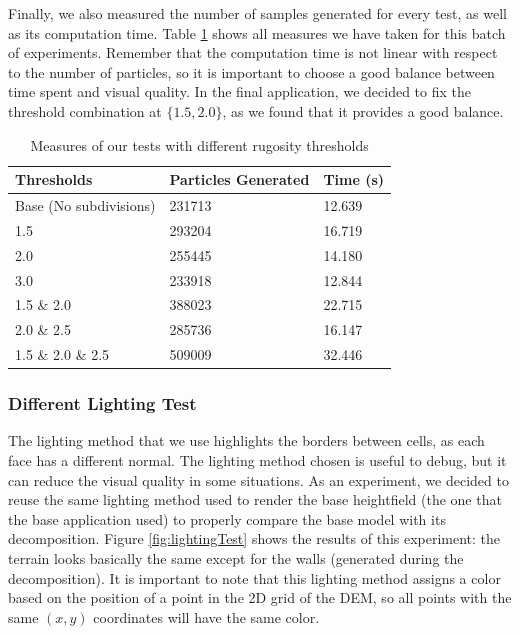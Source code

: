 \vspace{10pt}

Finally, we also measured the number of samples generated for every 
test, as well as its computation time. Table \ref{tab:rugosity} shows 
all measures we have taken for this batch of experiments. Remember 
that the computation time is not linear with respect to the number 
of particles, so it is important to choose a good balance between 
time spent and visual quality. In the final application, 
we decided to fix the threshold combination at $\{1.5, 2.0\}$, as 
we found that it provides a good balance.

\begin{table}[]
\centering
\begin{tabular}{|l|l|l|}
\hline
Thresholds             & Particles Generated & Time (s) \\ \hline
Base (No subdivisions) & 231713              & 12.639     \\ \hline
1.5                    & 293204              & 16.719     \\ \hline
2.0                    & 255445              & 14.180     \\ \hline
3.0                    & 233918              & 12.844     \\ \hline
1.5 \& 2.0              & 388023              & 22.715     \\ \hline
2.0 \& 2.5              & 285736              & 16.147     \\ \hline
1.5 \& 2.0 \& 2.5        & 509009              & 32.446     \\ \hline
\end{tabular}
\caption{Measures of our tests with different rugosity thresholds}
\label{tab:rugosity}
\end{table}

\subsubsection{Different Lighting Test}
The lighting method that we use highlights the borders between cells, 
as each face has a different normal. The lighting method chosen is 
useful to debug, but it can reduce the visual quality in some situations. 
As an experiment, we decided to reuse the same lighting method used to render 
the base heightfield (the one that the base application used) to 
properly compare the base model with its decomposition. Figure \ref{fig:lightingTest}
shows the results of this experiment: the terrain looks basically the 
same except for the walls (generated during the decomposition). It is 
important to note that this lighting method assigns a color based 
on the position of a point in the 2D grid of the DEM, so all points 
with the same $(x,y)$ coordinates will have the same color.

